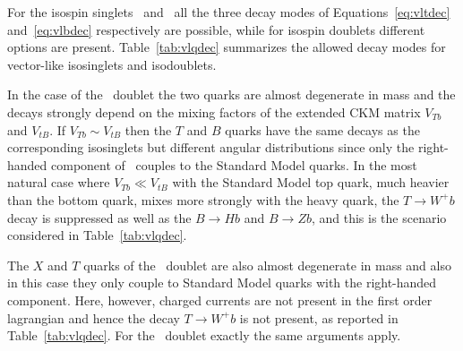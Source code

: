 For the isospin singlets \Tlr\ and \Blr\ all the 
three decay modes of Equations~\ref{eq:vltdec} and~\ref{eq:vlbdec}
respectively are possible, while for isospin doublets different
options are present. Table~\ref{tab:vlqdec} summarizes the
allowed  decay modes for vector-like isosinglets and isodoublets.

In the case of the \TBlr\ doublet the two quarks
are almost degenerate in mass and the decays strongly depend
on the mixing factors of the extended CKM matrix $V_{Tb}$ and
$V_{tB}$. If $V_{Tb}\sim V_{tB}$ then the $T$ and $B$ quarks
have the same decays as the corresponding isosinglets but
different angular distributions since only the right-handed
component of \TBlr\ couples to the Standard Model quarks.
In the most natural case where $V_{Tb} \ll V_{tB}$ with the
Standard Model top quark, much heavier than the bottom quark,
mixes more strongly with the heavy quark, the $T\to W^+ b$
decay is suppressed as well as the $B\to Hb$ and 
$B \to Zb$, and this is the scenario considered in 
Table~\ref{tab:vlqdec}.

The $X$ and $T$ quarks of the \XTlr\ doublet are also
almost degenerate in mass and also in this case they
only couple to Standard Model quarks with the 
right-handed component. Here, however, charged currents
are not present in the first order lagrangian and hence the
decay $T\to W^+ b$ is not present, as reported in 
Table~\ref{tab:vlqdec}.
For the \BYlr\ doublet exactly the same arguments apply.


